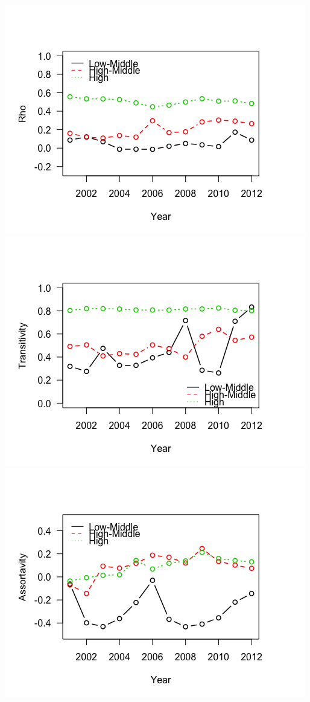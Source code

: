\documentclass{article}
\begin{document}
\includegraphics[scale=.8]{draft_figures/rho_income.png}\\
\includegraphics[scale=.8]{draft_figures/trans_income.png}\\
\includegraphics[scale=.8]{draft_figures/assort_income.png}
\end{document}
